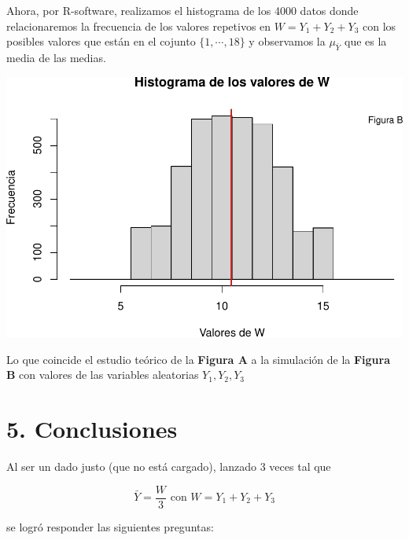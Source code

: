 \documentclass[
]{article}
\begin{document}
Ahora, por R-software, realizamos el histograma de los 4000 datos donde relacionaremos la frecuencia de los valores repetivos en $W = Y_{1}+Y_{2}+Y_{3}$ con los posibles valores que están en el cojunto $\{1, \cdots ,18\}$ y observamos la $\mu_{\bar{Y}}$ que es la media de las medias.

\includegraphics{inferencia_files/figure-latex/Figura (B)-1.pdf}

Lo que coincide el estudio teórico de la \textbf{Figura A} a la simulación de la  \textbf{Figura B} con valores de las variables aleatorias $Y_{1},Y_{2},Y_{3}$

\hypertarget{conclusiones}{%
\section{5. Conclusiones}\label{conclusiones}}

Al ser un dado justo (que no está cargado), lanzado 3 veces tal que 

$$\bar{Y} = \frac{W}{3} \text{  con  } W = Y_{1}+Y_{2}+Y_{3}$$

se logró responder las siguientes preguntas:
\end{document}

